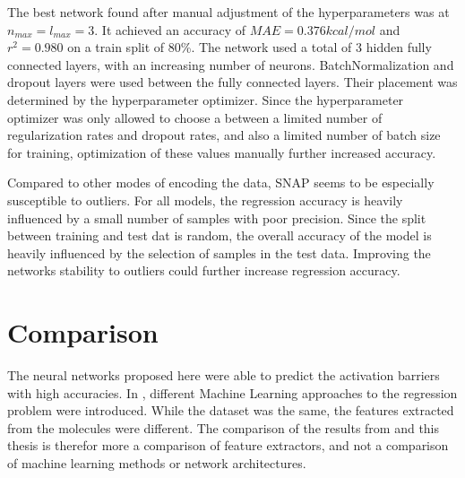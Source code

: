 The best network found after manual adjustment of the hyperparameters was at $n_{max}=l_{max}=3$.
It achieved an accuracy of $MAE=0.376 kcal/mol$ and $r^2=0.980$ on a train split of 80\%.
The network used a total of 3 hidden fully connected layers, with an increasing number of neurons.
BatchNormalization and dropout layers were used between the fully connected layers.
Their placement was determined by the hyperparameter optimizer.
Since the hyperparameter optimizer was only allowed to choose a between a limited number 
of regularization rates and dropout rates, and also a limited number of batch size for training,
optimization of these values manually further increased accuracy.

Compared to other modes of encoding the data, SNAP seems to be especially susceptible to outliers.
For all models, the regression accuracy is heavily influenced by a small number of samples with poor precision.
Since the split between training and test dat is random, the overall accuracy of the model is 
heavily influenced by the selection of samples in the test data.
Improving the networks stability to outliers could further increase regression accuracy.


\section{Comparison}
\label{sec:Evaluation:Comparison}

The neural networks proposed here were able to predict the activation barriers with high accuracies.
In \cite{friederich_dos}, different Machine Learning approaches to the regression problem were introduced.
While the dataset was the same, the features extracted from the molecules were different.
The comparison of the results from  and this thesis is therefor more 
a comparison of feature extractors, and not a comparison of machine learning methods or network architectures.

